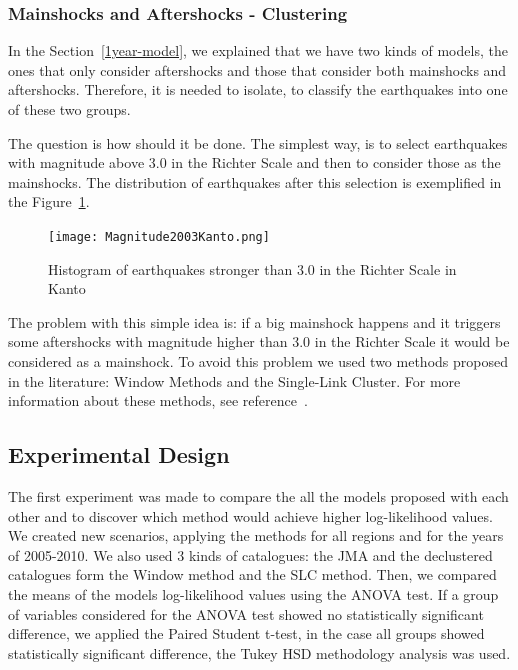 \subsubsection{Mainshocks and Aftershocks - Clustering}\label{Clustering}

In the Section~\ref{1year-model}, we explained that we have two kinds of models, the ones that only consider aftershocks and those that consider both mainshocks and aftershocks. Therefore, it is needed to isolate, to classify the earthquakes into one of these two groups.

The question is how should it be done. The simplest way, is to select earthquakes with magnitude above 3.0 in the Richter Scale and then to consider those as the mainshocks. The distribution of earthquakes after this selection is exemplified in the Figure~\ref{quakesKanto}.

\begin{figure}[!htb]
	\centering
	\texttt{[image: Magnitude2003Kanto.png]}
	\caption{Histogram of earthquakes stronger than 3.0 in the Richter Scale in Kanto}
	\label{quakesKanto}
\end{figure}

The problem with this simple idea is: if a big mainshock happens and it triggers some aftershocks with magnitude higher than 3.0 in the Richter Scale it would be considered as a mainshock. To avoid this problem we used two methods proposed in the literature: Window Methods and the Single-Link Cluster. For more information about these methods, see reference~\cite{van2012seismicity}.

\subsection{Experimental Design}

The first experiment was made to compare the all the models proposed with each other and to discover which method would achieve higher log-likelihood values. We created new scenarios, applying the methods for all regions and for the years of 2005-2010. We also used 3 kinds of catalogues: the JMA and the declustered catalogues form the Window method and the SLC method. Then, we compared the means of the models log-likelihood values using the ANOVA test. If a group of variables considered for the ANOVA test showed no statistically significant difference, we applied the Paired Student t-test, in the case all groups showed statistically significant difference, the Tukey HSD methodology analysis was used.

